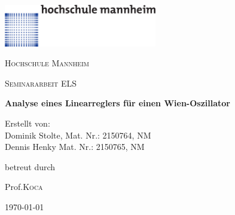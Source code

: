 \begin{titlepage}

  \includegraphics[width=0.5\textwidth]{../common/hsma-logo.pdf}\par\vspace{1cm}
  \centering
	{\scshape\LARGE Hochschule Mannheim \par}
	\vspace{1cm}
	{\scshape\Large Seminararbeit ELS\par}
	\vspace{1.5cm}
	{\huge\bfseries Analyse eines Linearreglers für einen Wien-Oszillator\par}
	\vspace{2cm}
	{\Large Erstellt von:\\
	Dominik Stolte, Mat. Nr.: 2150764, NM\\ 
	Dennis Henky Mat. Nr.: 2150765, NM\par}
	\vfill
	betreut durch\par
	Prof.\textsc{Koca}
	\vfill
	{\large \today\par}
\end{titlepage}